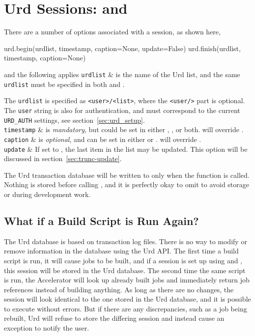 \section{Urd Sessions:   and }

There are a number of options associated with a session, as shown
here,
\begin{python}
urd.begin(urdlist, timestamp, caption=None, update=False)
urd.finish(urdlist, timestamp, caption=None)
\end{python}
and the following applies
\starttabletwo
\RPtwo \texttt{urdlist} & is the name of the Urd list, and the same
  \texttt{urdlist} must be specified in both 
  and .

  The \texttt{urdlist} is specified as \texttt{<user>/<list>}, where
  the \texttt{<user/>} part is optional.  The \texttt{user} string
  is also for authentication, and must correspond to the
  current \texttt{URD\_AUTH} settings, see section~\ref{sec:urd_setup}.\\[2ex]

\RPtwo \texttt{timestamp} & is \textsl{mandatory}, but could be set in either
  , , or both.  
  will override .\\[2ex]

\RPtwo \texttt{caption} & is \textsl{optional}, and can be set in either
   or .  
  will override .\\[2ex]

\RPtwo \texttt{update} &  If set to \pyTrue, the last item in the list may be updated.
  This option will be discussed in section~\ref{sec:trunc-update}.\\[2ex]
\stoptabletwo

The Urd transaction database will be written to only when
the  function is called.  Nothing is stored before
calling , and it is perfectly okay to
omit  to avoid storage or during development work.



\subsection{What if a Build Script is Run Again?}
The Urd database is based on transaction log files.  There is no way
to modify or remove information in the database using the Urd API.
The first time a build script is run, it will cause jobs to be built,
and if a session is set up using  and ,
this session will be stored in the Urd database.  The second time the
same script is run, the Accelerator will look up already built jobs
and immediately return job references instead of building anything.
As long as there are no changes, the session will look identical to
the one stored in the Urd database, and it is possible to
execute  without errors.  But if there are any
discrepancies, such as a job being rebuilt, Urd will refuse to store
the differing session and instead cause an exception to notify the
user.

